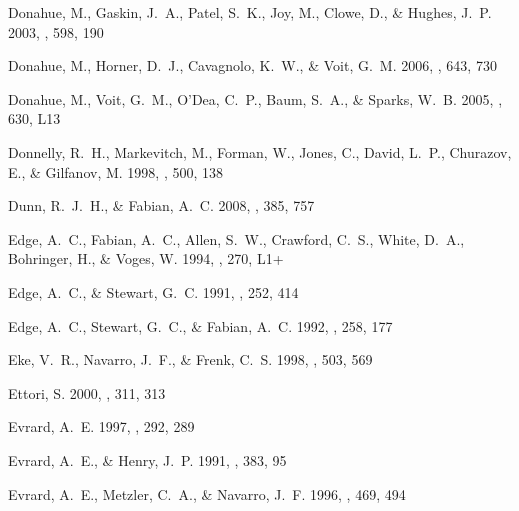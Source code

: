 \documentclass[12pt,preprint]{aastex}
\begin{document}
\begin{thebibliography}{138}
{Donahue}, M., {Gaskin}, J.~A., {Patel}, S.~K., {Joy}, M., {Clowe}, D., \&
  {Hughes}, J.~P. 2003, \apj, 598, 190

{Donahue}, M., {Horner}, D.~J., {Cavagnolo}, K.~W., \& {Voit}, G.~M. 2006,
  \apj, 643, 730

{Donahue}, M., {Voit}, G.~M., {O'Dea}, C.~P., {Baum}, S.~A., \& {Sparks}, W.~B.
  2005, \apjl, 630, L13

{Donnelly}, R.~H., {Markevitch}, M., {Forman}, W., {Jones}, C., {David}, L.~P.,
  {Churazov}, E., \& {Gilfanov}, M. 1998, \apj, 500, 138

{Dunn}, R.~J.~H., \& {Fabian}, A.~C. 2008, \mnras, 385, 757

{Edge}, A.~C., {Fabian}, A.~C., {Allen}, S.~W., {Crawford}, C.~S., {White},
  D.~A., {Bohringer}, H., \& {Voges}, W. 1994, \mnras, 270, L1+

{Edge}, A.~C., \& {Stewart}, G.~C. 1991, \mnras, 252, 414

{Edge}, A.~C., {Stewart}, G.~C., \& {Fabian}, A.~C. 1992, \mnras, 258, 177

{Eke}, V.~R., {Navarro}, J.~F., \& {Frenk}, C.~S. 1998, \apj, 503, 569

{Ettori}, S. 2000, \mnras, 311, 313

{Evrard}, A.~E. 1997, \mnras, 292, 289

{Evrard}, A.~E., \& {Henry}, J.~P. 1991, \apj, 383, 95

{Evrard}, A.~E., {Metzler}, C.~A., \& {Navarro}, J.~F. 1996, \apj, 469, 494


\end{thebibliography}
\end{document}
